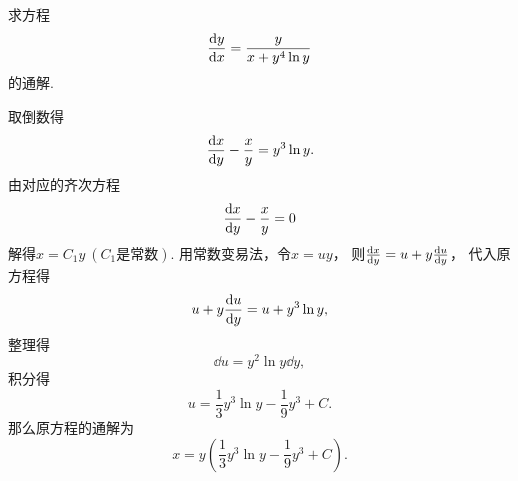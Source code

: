 \begin{example}
求方程\begin{equation*}
	\dv{y}{x} = \frac{y}{x + y^4 \ln y}
\end{equation*}的通解.
\begin{solution}
取倒数得\begin{equation*}
	\dv{x}{y} - \frac{x}{y} = y^3 \ln y.
\end{equation*}
由对应的齐次方程\begin{equation*}
	\dv{x}{y} - \frac{x}{y} = 0
\end{equation*}解得\(x = C_1 y\ (\text{$C_1$是常数})\).
用常数变易法，令\(x = u y\)，
则\(\dv{x}{y} = u + y \dv{u}{y}\)，
代入原方程得\begin{equation*}
	u + y \dv{u}{y} = u + y^3 \ln y,
\end{equation*}
整理得\begin{equation*}
	\dd{u} = y^2 \ln y \dd{y},
\end{equation*}
积分得\begin{equation*}
	u = \frac13 y^3 \ln y - \frac19 y^3 + C.
\end{equation*}
那么原方程的通解为\begin{equation*}
	x = y \left( \frac13 y^3 \ln y - \frac19 y^3 + C \right).
\end{equation*}
\end{solution}
\end{example}

